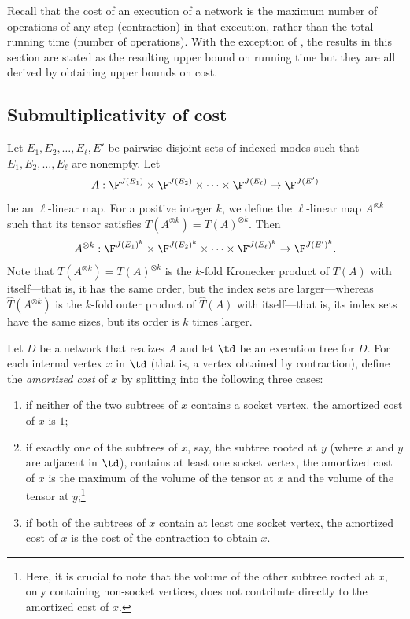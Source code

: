 Recall that the cost of an execution of a network is the maximum
number of operations of any step (contraction) in that execution,
rather than the total running time (number of operations).  With the
exception of , the results in
this section are stated as the resulting upper bound on running time
but they are all derived by obtaining upper bounds on cost.

\subsection{Submultiplicativity of cost}
\label{sec:submultiplicativity}

Let $E_1,E_2,\ldots,E_\ell,E'$ be pairwise disjoint sets of indexed modes
such that $E_1,E_2,\ldots,E_\ell$ are nonempty. Let
\[
A:\F^{J(E_1)}\times\F^{J(E_2)}\times\cdots \times\F^{J(E_\ell)}
      \rightarrow \F^{J(E')}
\]
be an $\ell$-linear map.
For a positive integer $k$, we
define the $\ell$-linear map $A^{\otimes k}$ such that its tensor satisfies $T(A^{\otimes k})=T(A)^{\otimes k}$.  Then
\[
A^{\otimes k}:\F^{J(E_1)^k}\times\F^{J(E_2)^k}\times\cdots \times\F^{J(E_\ell)^k}
      \rightarrow \F^{J(E')^k}.
\]
Note that $T(A^{\otimes k}) = T(A)^{\otimes k}$ is the $k$-fold
Kronecker product of $T(A)$ with itself---that is, it has the same order,
but the index sets are larger---whereas $\hat{T}(A^{\otimes k})$ is
the $k$-fold outer product of $\hat{T}(A)$ with itself---that is, its
index sets have the same sizes, but its order is $k$ times larger.

Let $D$ be a network that realizes $A$ and let $\td$ be an execution
tree for $D$.
For each internal vertex $x$ in $\td$ (that is, a vertex obtained by contraction),
define the \emph{amortized cost} of $x$ by splitting into the following
three cases:
\begin{enumerate}%
\item
if neither of the two subtrees of $x$ contains a socket vertex,
the amortized cost of $x$ is $1$;
\item
if exactly one of the subtrees of $x$,
say, the subtree rooted at $y$ (where $x$ and $y$ are adjacent in $\td$),
contains at least one socket vertex, the amortized cost of
$x$ is the maximum of the volume of the tensor at $x$ and the volume of
the tensor at $y$;\footnote{Here, it is crucial to note that the volume of the other subtree rooted at $x$, only containing non-socket vertices, does not contribute directly to the amortized cost of $x$.}
\item
if both of the subtrees of $x$ contain at
least one socket vertex, the amortized cost of $x$ is the
cost of the contraction to obtain $x$.
\end{enumerate}

